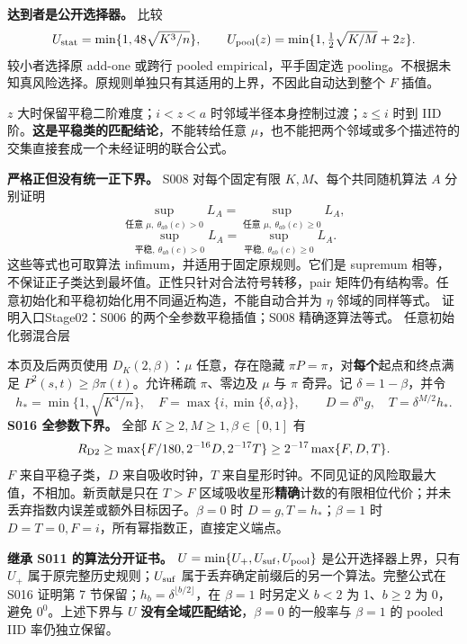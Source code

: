 \documentclass[11pt,a4paper]{article}
\newcommand{\head}[2]{{\small\sffamily #1}\par\vspace{2pt}{\LARGE\bfseries #2}\par\vspace{5pt}}
\newcommand{\entry}[1]{\vfill\noindent\small 证明入口\quad #1\normalsize}
\begin{document}
\textbf{达到者是公开选择器。} 比较
\[
 U_{\rm stat}=\min\{1,48\sqrt{K^3/n}\},\qquad
 U_{\rm pool}(z)=\min\{1,\tfrac12\sqrt{K/M}+2z\}.
\]
较小者选择原 add-one 或跨行 pooled empirical，平手固定选 pooling。不根据未知真风险选择。原规则单独只有其适用的上界，不因此自动达到整个 $F$ 插值。

$z$ 大时保留平稳二阶难度；$i<z<a$ 时邻域半径本身控制过渡；$z\le i$ 时到 IID 阶。\textbf{这是平稳类的匹配结论}，不能转给任意 $\mu$，也不能把两个邻域或多个描述符的交集直接套成一个未经证明的联合公式。

\textbf{严格正但没有统一正下界。} S008 对每个固定有限 $K,M$、每个共同随机算法 $A$ 分别证明
\[
 \sup_{\text{任意 }\mu,\ \theta_{ab}(c)>0}L_A
  =\sup_{\text{任意 }\mu,\ \theta_{ab}(c)\ge0}L_A,
\]
\[
 \sup_{\text{平稳},\ \theta_{ab}(c)>0}L_A
  =\sup_{\text{平稳},\ \theta_{ab}(c)\ge0}L_A.
\]
这些等式也可取算法 infimum，并适用于固定原规则。它们是 supremum 相等，不保证正子类达到最坏值。正性只针对合法符号转移，pair 矩阵仍有结构零。任意初始化和平稳初始化用不同逼近构造，不能自动合并为 $\eta$ 邻域的同样等式。
\entry{Stage02：S006 的两个全参数平稳插值；S008 精确逐算法等式。}
\newpage
\head{任意初始化弱混合层}{统一下界账本与旧证书的范围}
本页及后两页使用 $D_K(2,\beta)$：$\mu$ 任意，存在隐藏 $\pi P=\pi$，对\textbf{每个}起点和终点满足 $P^2(s,t)\ge\beta\pi(t)$。允许稀疏 $\pi$、零边及 $\mu$ 与 $\pi$ 奇异。记 $\delta=1-\beta$，并令
\[
 h_*=\min\{1,\sqrt{K^4/n}\},\quad F=\max\{i,\min\{\delta,a\}\},
 \qquad D=\delta^n g,\quad T=\delta^{M/2}h_*.
\]
\textbf{S016 全参数下界。} 全部 $K\ge2,M\ge1,\beta\in[0,1]$ 有
\[
 R_{\mathrm{D2}}\ge\max\{F/180,2^{-16}D,2^{-17}T\}
       \ge2^{-17}\max\{F,D,T\}.
\]
$F$ 来自平稳子类，$D$ 来自吸收时钟，$T$ 来自星形时钟。不同见证的风险取最大值，不相加。新贡献是只在 $T>F$ 区域吸收星形\textbf{精确}计数的有限相位代价；并未丢弃指数内误差或额外目标因子。$\beta=0$ 时 $D=g,T=h_*$；$\beta=1$ 时 $D=T=0,F=i$，所有幂指数正，直接定义端点。

\textbf{继承 S011 的算法分开证书。} $U=\min\{U_+,U_{\rm suf},U_{\rm pool}\}$ 是公开选择器上界，只有 $U_+$ 属于原完整历史规则；$U_{\rm suf}$ 属于丢弃确定前缀后的另一个算法。完整公式在 S016 证明第 7 节保留；$h_b=\delta^{\lfloor b/2\rfloor}$，在 $\beta=1$ 时另定义 $b<2$ 为 1、$b\ge2$ 为 0，避免 $0^0$。上述下界与 $U$ \textbf{没有全域匹配结论}，$\beta=0$ 的一般率与 $\beta=1$ 的 pooled IID 率仍独立保留。
\end{document}
